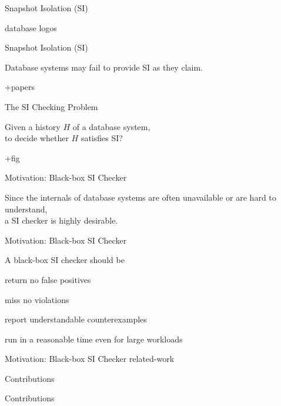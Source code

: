 \begin{frame}{Snapshot Isolation (SI)}
  \begin{center}
    database logos
  \end{center}
\end{frame}

\begin{frame}{Snapshot Isolation (SI)}
  \begin{center}
    Database systems may fail to provide SI as they claim.

    +papers
  \end{center}
\end{frame}

\begin{frame}{The SI Checking Problem}
  \begin{center}
    Given a history $H$ of a database system, \\[6pt]
    to decide whether $H$ satisfies SI?

    +fig
  \end{center}
\end{frame}

\begin{frame}{Motivation: Black-box SI Checker}
  \begin{center}
    Since the internals of database systems are often unavailable
    or are hard to understand, \\[6pt]
    a  SI checker is highly desirable.
  \end{center}
\end{frame}

\begin{frame}{Motivation: Black-box SI Checker}
  \begin{center}
    A black-box SI checker should be \\[8pt]
    \begin{description}
      \setlength{\itemsep}{6pt}
      \item[Sound:] return no false positives
      \item[Complete:] miss no violations
      \item[Informative:] report understandable counterexamples
      \item[Efficient:] run in a reasonable time even for large workloads
    \end{description}
  \end{center}
\end{frame}

\begin{frame}{Motivation: Black-box SI Checker}
  related-work
\end{frame}

\begin{frame}{Contributions}
\end{frame}

\begin{frame}{Contributions}
\end{frame}
